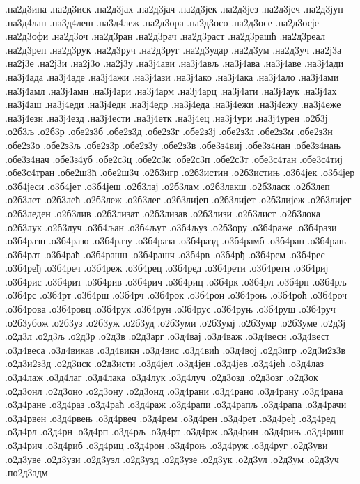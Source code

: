 {.на2д3ина
.на2д3иск
.на2д3јах
.на2д3јач
.на2д3јек
.на2д3јез
.на2д3јеч
.на2д3јун
.на3д4лан
.на3д4леш
.на3д4леж
.на2д3ора
.на2д3осо
.на2д3осе
.на2д3осје
.на2д3офи
.на2д3оч
.на2д3ран
.на2д3рач
.на2д3раст
.на2д3рашћ
.на2д3реал
.на2д3реп
.на2д3рук
.на2д3руч
.на2д3руг
.на2д3удар
.на2д3ум
.на2д3уч
.на2ј3а
.на2ј3е
.на2ј3и
.на2ј3о
.на2ј3у
.на3ј4ави
.на3ј4ављ
.на3ј4ава
.на3ј4аве
.на3ј4ади
.на3ј4ада
.на3ј4аде
.на3ј4ажи
.на3ј4ази
.на3ј4ако
.на3ј4ака
.на3ј4ало
.на3ј4ами
.на3ј4амл
.на3ј4амн
.на3ј4ари
.на3ј4арм
.на3ј4арц
.на3ј4ати
.на3ј4аук
.на3ј4ах
.на3ј4аш
.на3ј4еди
.на3ј4едн
.на3ј4едр
.на3ј4еда
.на3ј4ежи
.на3ј4ежу
.на3ј4еже
.на3ј4езн
.на3ј4езд
.на3ј4ести
.на3ј4етк
.на3ј4ец
.на3ј4ури
.на3ј4урен
.о2б3ј
.о2б3љ
.о2б3р
.обе2з3б
.обе2з3д
.обе2з3г
.обе2з3ј
.обе2з3л
.обе2з3м
.обе2з3н
.обе2з3о
.обе2з3љ
.обе2з3р
.обе2з3у
.обе2з3в
.обе3з4виј
.обе3з4нан
.обе3з4нањ
.обе3з4нач
.обе3з4уб
.обе2с3ц
.обе2с3к
.обе2с3п
.обе2с3т
.обе3с4тан
.обе3с4тиј
.обе3с4тран
.обе2ш3ћ
.обе2ш3ч
.о2б3игр
.о2б3истин
.о2б3истињ
.о3б4јек
.о3б4јер
.о3б4јеси
.о3б4јет
.о3б4јеш
.о2б3лај
.о2б3лам
.о2б3лакш
.о2б3ласк
.о2б3леп
.о2б3лет
.о2б3лећ
.о2б3леж
.о2б3лег
.о2б3лијеп
.о2б3лијет
.о2б3лијеж
.о2б3лијег
.о2б3леден
.о2б3лив
.о2б3лизат
.о2б3лизав
.о2б3лизи
.о2б3лист
.о2б3лока
.о2б3лук
.о2б3луч
.о3б4љан
.о3б4љут
.о3б4љуз
.о2б3ору
.о3б4раже
.о3б4рази
.о3б4разн
.о3б4разо
.о3б4разу
.о3б4раза
.о3б4разд
.о3б4рамб
.о3б4ран
.о3б4рањ
.о3б4рат
.о3б4раћ
.о3б4рашн
.о3б4рашч
.о3б4рв
.о3б4рђ
.о3б4рем
.о3б4рес
.о3б4ређ
.о3б4реч
.о3б4реж
.о3б4рец
.о3б4ред
.о3б4рети
.о3б4ретн
.о3б4риј
.о3б4рис
.о3б4рит
.о3б4рив
.о3б4рич
.о3б4риц
.о3б4рк
.о3б4рл
.о3б4рн
.о3б4рљ
.о3б4рс
.о3б4рт
.о3б4рш
.о3б4рч
.о3б4рок
.о3б4рон
.о3б4роњ
.о3б4роћ
.о3б4роч
.о3б4рова
.о3б4ровц
.о3б4рук
.о3б4рун
.о3б4рус
.о3б4руњ
.о3б4руш
.о3б4руч
.о2б3убож
.о2б3уз
.о2б3уж
.о2б3уд
.о2б3уми
.о2б3умј
.о2б3умр
.о2б3уме
.о2д3ј
.о2д3л
.о2д3љ
.о2д3р
.о2д3в
.о2д3арг
.о3д4вај
.о3д4важ
.о3д4весн
.о3д4вест
.о3д4веса
.о3д4викав
.о3д4викн
.о3д4вис
.о3д4вић
.о3д4вој
.о2д3игр
.о2д3и2з3в
.о2д3и2з3д
.о2д3иск
.о2д3исти
.о3д4јел
.о3д4јен
.о3д4јев
.о3д4јећ
.о3д4лаз
.о3д4лаж
.о3д4лаг
.о3д4лака
.о3д4лук
.о3д4луч
.о2д3озд
.о2д3озг
.о2д3ок
.о2д3онл
.о2д3оно
.о2д3ону
.о2д3онд
.о3д4рани
.о3д4рано
.о3д4рану
.о3д4рана
.о3д4ране
.о3д4раз
.о3д4раћ
.о3д4раж
.о3д4рапи
.о3д4рапљ
.о3д4рапа
.о3д4рачи
.о3д4рвен
.о3д4рвењ
.о3д4рвеч
.о3д4рем
.о3д4рен
.о3д4рет
.о3д4ређ
.о3д4ред
.о3д4рл
.о3д4рн
.о3д4рп
.о3д4рљ
.о3д4рт
.о3д4рж
.о3д4рин
.о3д4рињ
.о3д4риш
.о3д4рич
.о3д4риб
.о3д4риц
.о3д4рон
.о3д4роњ
.о3д4руж
.о3д4руг
.о2д3уви
.о2д3уве
.о2д3узи
.о2д3узл
.о2д3узд
.о2д3узе
.о2д3ук
.о2д3ул
.о2д3ум
.о2д3уч
.по2д3адм
}
